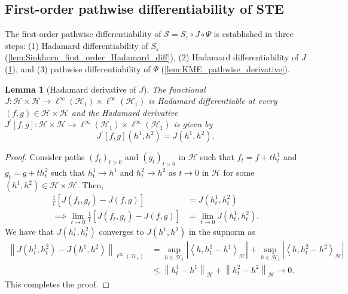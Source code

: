 \documentclass{article}
\theoremstyle{plain}
\newtheorem{lemma}[theorem]{Lemma}
\theoremstyle{definition}
\theoremstyle{remark}
\newcommand{\off}[1]{\left[#1\right]}
\newcommand{\abs}[1]{\left|#1\right|}
\newcommand{\cH}{\mathcal{H}}
\newcommand{\1}{\mathbbm{1}}
\newcommand{\STE}{\mathscr{S}}
\newcommand{\eps}{\varepsilon}
\newcommand{\iprod}[1]{\left\langle #1 \right\rangle}
\newcommand{\norm}[1]{\left \| #1 \right \|}
\theoremstyle{plain}
\theoremstyle{definition}
\begin{document}
\subsection{First-order pathwise differentiability of STE}\label{appendix:STE_first_order_pathwise_diff}

The first-order pathwise differentiability of $\STE = S_\eps \circ J \circ \Psi$ is established in three steps: (1) Hadamard differentiability of $S_\eps$ (\cref{lem:Sinkhorn_first_order_Hadamard_diff}), (2) Hadamard differentiability of $J$ (\cref{lem:J_hadamard_diff}), and (3) pathwise differentiability of $\Psi$ (\cref{lem:KME_pathwise_derivative}). 


\begin{lemma}[Hadamard derivative of $J$]\label{lem:J_hadamard_diff}
    The functional $J: \cH \times \cH \to \ell^{\infty}(\cH_1) \times \ell^{\infty}(\cH_1)$ is Hadamard differentiable at every $(f,g) \in \cH \times \cH$ and the Hadamard derivative $J^\prime[f,g]: \cH \times \cH \to \ell^{\infty}(\cH_1) \times \ell^{\infty}(\cH_1)$ is given by
    \[
    J^\prime[f,g](h^1, h^2) = J(h^1, h^2).
    \]
\end{lemma}

\begin{proof}
    Consider paths $(f_t)_{t>0}$ and $(g_t)_{t>0}$ in $\cH$ such that $f_t = f + t h_t^1$ and $g_t = g + t h_t^2$ such that $h_t^1 \to h^1$ and $h_t^2 \to h^2$ as $t\to 0$ in $\cH$ for some $(h^1, h^2) \in \cH \times \cH$. Then,
    \begin{align*}
        \frac{1}{t}\off{J(f_t, g_t) - J(f,g)} &= J(h_t^1, h_t^2)\\
        \implies \lim_{t \to 0} \frac{1}{t}\off{J(f_t, g_t) - J(f,g)} &= \lim_{t \to 0} J(h_t^1, h_t^2).
    \end{align*}
    We have that $J(h_t^1, h_t^2)$ converges to $J(h^1, h^2)$ in the supnorm as
    \begin{align*}
        \norm{J(h_t^1, h_t^2) - J(h^1, h^2)}_{\ell^\infty(\cH_1)} &= \sup_{h \in \cH_1} \abs{\iprod{h, h_t^1 - h^1}_\cH} + \sup_{h \in \cH_1} \abs{\iprod{h, h_t^2 - h^2}_\cH}\\
        &\leq \norm{h_t^1 - h^1}_\cH + \norm{h_t^2 - h^2}_\cH \to 0.
    \end{align*}
    This completes the proof.
\end{proof}
\end{document}
